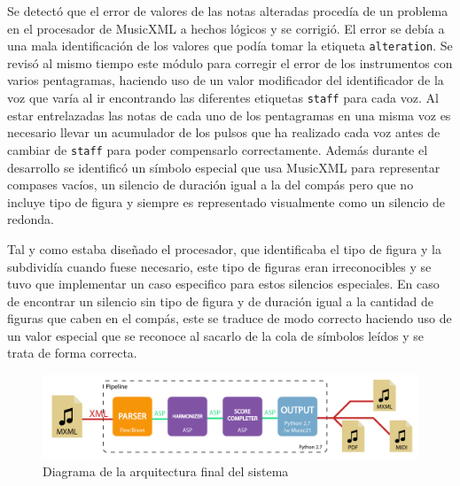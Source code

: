 Se detectó que el error de valores de las notas alteradas procedía de un problema en el procesador de MusicXML a hechos lógicos y se corrigió. El error se debía a una mala identificación de los valores que podía tomar la etiqueta \texttt{alteration}. Se revisó al mismo tiempo este módulo para corregir el error de los instrumentos con varios pentagramas, haciendo uso de un valor modificador del identificador de la voz que varía al ir encontrando las diferentes etiquetas \texttt{staff} para cada voz. Al estar entrelazadas las notas de cada uno de los pentagramas en una misma voz es necesario llevar un acumulador de los pulsos que ha realizado cada voz antes de cambiar de \texttt{staff} para poder compensarlo correctamente. Además durante el desarrollo se identificó un símbolo especial que usa MusicXML para representar compases vacíos, un silencio de duración igual a la del compás pero que no incluye tipo de figura y siempre es representado visualmente como un silencio de redonda.

Tal y como estaba diseñado el procesador, que identificaba el tipo de figura y la subdividía cuando fuese necesario, este tipo de figuras eran irreconocibles y se tuvo que implementar un caso especifico para estos silencios especiales. En caso de encontrar un silencio sin tipo de figura y de duración igual a la cantidad de figuras que caben en el compás, este se traduce de modo correcto haciendo uso de un valor especial que se reconoce al sacarlo de la cola de símbolos leídos y se trata de forma correcta.

\begin{figure}
	\centering
	\includegraphics[width=0.8\linewidth]{imagenes/arquitectura_final.pdf}
	\caption{Diagrama de la arquitectura final del sistema}
	\label{fig:arquitectura_final}
\end{figure}

